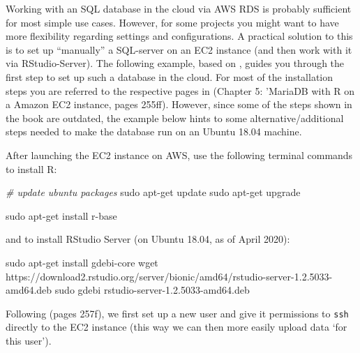 \documentclass[
  12pt,
]{style/krantz}
\newenvironment{Shaded}{\begin{snugshade}}{\end{snugshade}}
\newcommand{\CommentTok}[1]{\textcolor[rgb]{0.56,0.35,0.01}{\textit{#1}}}
\newcommand{\FunctionTok}[1]{\textcolor[rgb]{0.00,0.00,0.00}{#1}}
\newcommand{\NormalTok}[1]{#1}
\begin{document}
Working with an SQL database in the cloud via AWS RDS is probably sufficient for most simple use cases. However, for some projects you might want to have more flexibility regarding settings and configurations. A practical solution to this is to set up ``manually'' a SQL-server on an EC2 instance (and then work with it via RStudio-Server). The following example, based on \citet{walkowiak_2016}, guides you through the first step to set up such a database in the cloud. For most of the installation steps you are referred to the respective pages in \citet{walkowiak_2016} (Chapter 5: 'MariaDB with R on a Amazon EC2 instance, pages 255ff). However, since some of the steps shown in the book are outdated, the example below hints to some alternative/additional steps needed to make the database run on an Ubuntu 18.04 machine.

After launching the EC2 instance on AWS, use the following terminal commands to install R:

\begin{Shaded}
\begin{Highlighting}[]
\CommentTok{\# update ubuntu packages}
 \FunctionTok{sudo}\NormalTok{ apt{-}get update}
 \FunctionTok{sudo}\NormalTok{ apt{-}get upgrade}
\end{Highlighting}
\end{Shaded}

\begin{Shaded}
\begin{Highlighting}[]
\FunctionTok{sudo}\NormalTok{ apt{-}get install r{-}base}
\end{Highlighting}
\end{Shaded}

and to install RStudio Server (on Ubuntu 18.04, as of April 2020):

\begin{Shaded}
\begin{Highlighting}[]
\FunctionTok{sudo}\NormalTok{ apt{-}get install gdebi{-}core}
\FunctionTok{wget}\NormalTok{ https://download2.rstudio.org/server/bionic/amd64/rstudio{-}server{-}1.2.5033{-}amd64.deb}
\FunctionTok{sudo}\NormalTok{ gdebi rstudio{-}server{-}1.2.5033{-}amd64.deb}
\end{Highlighting}
\end{Shaded}

Following \citet{walkowiak_2016} (pages 257f), we first set up a new user and give it permissions to \texttt{ssh} directly to the EC2 instance (this way we can then more easily upload data `for this user').
\end{document}
